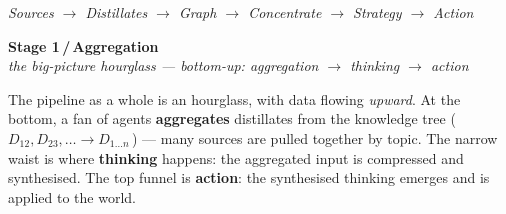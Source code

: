 \documentclass[11pt]{article}
\newcommand{\stage}[3]{%
    {\Large\color{accent}\textbf{Stage #1\,/\,#2}}\\[2pt]
    {\color{soft}\itshape #3}\par\vspace{8pt}%
}
\begin{document}
\vfill
\begin{center}
{\footnotesize\color{soft}\itshape Sources $\longrightarrow$ Distillates $\longrightarrow$ Graph $\longrightarrow$ Concentrate $\longrightarrow$ Strategy $\longrightarrow$ Action}
\end{center}
\vspace{2cm}
\newpage

\stage{1}{Aggregation}{the big-picture hourglass — bottom-up: aggregation $\longrightarrow$ thinking $\longrightarrow$ action}

The pipeline as a whole is an hourglass, with data flowing \emph{upward}. At
the bottom, a fan of agents \textbf{aggregates} distillates from the
knowledge tree (\,$D_{12}, D_{23}, \ldots \to D_{1\ldots n}$\,) — many sources
are pulled together by topic. The narrow waist is where \textbf{thinking}
happens: the aggregated input is compressed and synthesised. The top funnel
is \textbf{action}: the synthesised thinking emerges and is applied to the
world.
\end{document}
